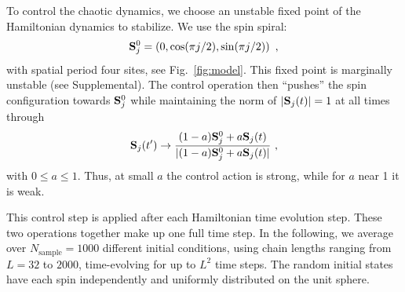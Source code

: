 \documentclass[twocolumn,amsmath,amssymb,floatfix,superscriptaddress,aps,prl]{revtex4-2}
\begin{document}
To control the chaotic dynamics, we choose an %
unstable fixed point of the Hamiltonian dynamics to stabilize.  We use the spin spiral:  %
\begin{equation}
    {\bf S}_j^{0}=\left(0,\cos(\pi j/2 ),\sin(\pi j/2 )\right)~,
    \label{eqn:spinspiral}
\end{equation}
with spatial period four sites, see Fig.~\ref{fig:model}.  This fixed point is marginally unstable (see Supplemental). %
The control operation then 
``pushes''   the spin configuration towards  ${\bf S}_j^{0}$ %
while maintaining the norm of $|{\bf S}_j(t)|=1$ at all times through
\begin{equation}
    {\bf S}_j(t') \rightarrow \frac{(1-a){\bf S}^{0}_j + a{\bf S}_j(t)}{| (1-a){\bf S}^{0}_j + a{\bf S}_j(t)|}~,
    \label{eq:control}
\end{equation}
with $0\leq a\leq 1$.  Thus, at small $a$ the control action is strong, while for $a$ near 1 it is weak.  

This control step is applied after each Hamiltonian time evolution step.  These two operations together make up one full time step.
In the following, we average over $N_{\mathrm{sample}}=1000$ 
different initial conditions, using chain lengths ranging from $L=32$ to $2000$, time-evolving for up to $L^2$ time steps.  The random initial states have each spin independently and uniformly distributed on the unit sphere. %
\end{document}
